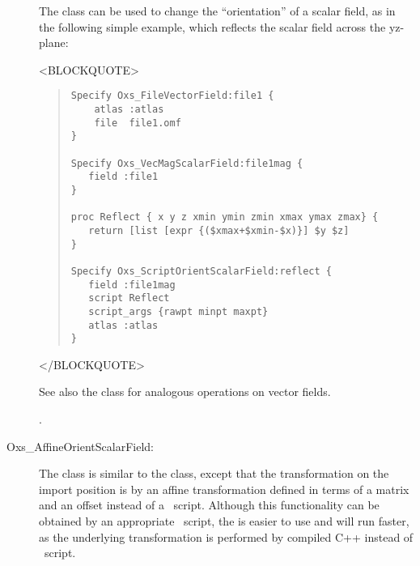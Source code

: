 \begin{description}
The  class can be used to change the
``orientation'' of a scalar field, as in the following simple example,
which reflects the  scalar field across the yz-plane:
\begin{rawhtml}
<BLOCKQUOTE>
\end{rawhtml}
\begin{quote}
\begin{verbatim}
Specify Oxs_FileVectorField:file1 {
    atlas :atlas
    file  file1.omf
}

Specify Oxs_VecMagScalarField:file1mag {
   field :file1
}

proc Reflect { x y z xmin ymin zmin xmax ymax zmax} {
   return [list [expr {($xmax+$xmin-$x)}] $y $z]
}

Specify Oxs_ScriptOrientScalarField:reflect {
   field :file1mag
   script Reflect
   script_args {rawpt minpt maxpt}
   atlas :atlas
}
\end{verbatim}
\end{quote}
\begin{rawhtml}
</BLOCKQUOTE>
\end{rawhtml}
See also the
class for
analogous operations on vector fields.

\begin{ExampleMifs}[Example]
  .
\end{ExampleMifs}

%
\item[Oxs\_AffineOrientScalarField:\label{item:AffineOrientScalarField}]
The  class is similar to the
 class, except that the transformation
on the import position is by an affine transformation defined in terms
of a  matrix and an offset instead of a
\Tcl\ script.  Although this functionality can be obtained by an
appropriate \Tcl\ script, the  is
easier to use and will run faster, as the underlying transformation is
performed by compiled C++ instead of \Tcl\ script.


\end{description}
